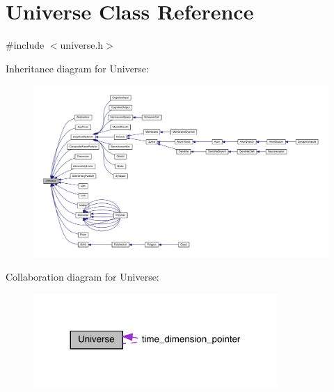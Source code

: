 \hypertarget{class_universe}{}\section{Universe Class Reference}
\label{class_universe}


{\ttfamily \#include $<$universe.\+h$>$}



Inheritance diagram for Universe\+:\nopagebreak
\begin{figure}[H]
\begin{center}
\leavevmode
\includegraphics[width=350pt]{class_universe__inherit__graph}
\end{center}
\end{figure}


Collaboration diagram for Universe\+:\nopagebreak
\begin{figure}[H]
\begin{center}
\leavevmode
\includegraphics[width=263pt]{class_universe__coll__graph}
\end{center}
\end{figure}

